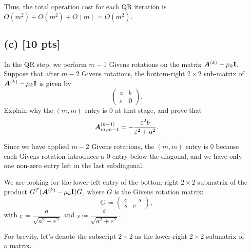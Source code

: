 \documentclass[twoside,10pt]{article}
\begin{document}
  Thus, the total operation cost for each QR iteration is $O(m^2) + O(m^2) + O(m) = O(m^2)$.

  \subsection*{(c) [10 pts]}
  In the QR step, we perform $m - 1$ Givens rotations on the matrix $\bm{A}^{(k)} - \mu_k \mathbf{I}$. 
  Suppose that after $m - 2$ Givens rotations, the bottom-right $2 \times 2$ sub-matrix of $\bm{A}^{(k)} - \mu_k \mathbf{I}$ is given by
  \begin{equation}
    \begin{pmatrix}
      a & b \\
      \varepsilon & 0
    \end{pmatrix}.
  \end{equation}
  Explain why the $(m, m)$ entry is $0$ at that stage, and prove that 
  \begin{equation}
    \bm{A}_{m, m-1}^{(k + 1)} = - \frac{\varepsilon^2 b}{\varepsilon^2 + a^2}.
  \end{equation}

\quad Since we have applied $m-2$ Givens rotations, the $(m, m)$ entry is $0$ because each Givens rotation introduces a $0$ entry below the diagonal, and we have only one non-zero entry left in the last subdiagonal.

We are looking for the lower-left entry of the bottom-right $2\times2$ submatrix of the product $G^T(\bm{A}^{(k)} - \mu_k \mathbf{I})G$, where $G$ is the Givens rotation matrix:
$$G \coloneqq \begin{pmatrix}
      c & -s \\
      s & c
\end{pmatrix},
$$
with $c \coloneqq \dfrac{a}{\sqrt{a^2 + \varepsilon^2}}$ and $s \coloneqq \dfrac{\varepsilon}{\sqrt{a^2 + \varepsilon^2}}$.

For brevity, let's denote the subscript $2\times2$ as the lower-right $2\times2$ submatrix of a matrix.
\end{document}
